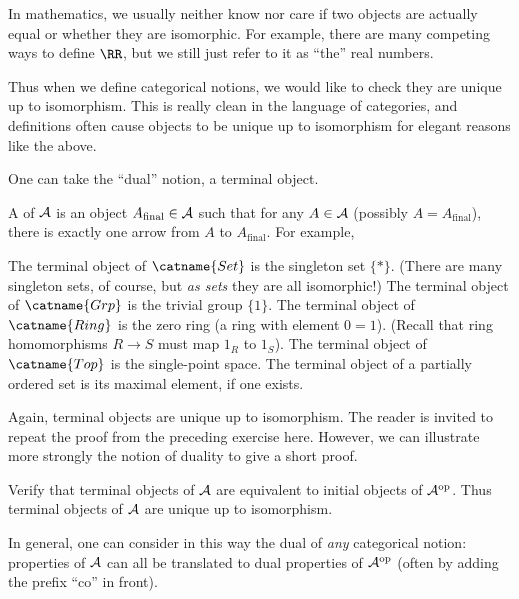 \begin{remark}
	In mathematics, we usually neither know nor care if two objects are actually equal
	or whether they are isomorphic.
	For example, there are many competing ways to define $\RR$,
	but we still just refer to it as ``the'' real numbers.

	Thus when we define categorical notions, we would like to check they are
	unique up to isomorphism.
	This is really clean in the language of categories, and definitions
	often cause objects to be unique up to isomorphism for elegant reasons like the above.
\end{remark}

One can take the ``dual'' notion, a terminal object.
\begin{example}
	A  of $\AA$ is an object
	$A_{\text{final}} \in \AA$ such that for any $A \in \AA$ (possibly $A = A_{\text{final}}$),
	there is exactly one arrow from $A$ to $A_{\text{final}}$.
	For example,
	\begin{enumerate}[(a)]
		\ii The terminal object of $\catname{Set}$ is the singleton set $\{\ast\}$.
		(There are many singleton sets, of course, but \emph{as sets} they are all isomorphic!)
		\ii The terminal object of $\catname{Grp}$ is the trivial group $\{1\}$.
		\ii The terminal object of $\catname{Ring}$ is the zero ring (a ring with element $0=1$).
		(Recall that ring homomorphisms $R \to S$ must map $1_R$ to $1_S$).
		\ii The terminal object of $\catname{Top}$ is the single-point space.
		\ii The terminal object of a partially ordered set is its maximal element, if one exists.
	\end{enumerate}
\end{example}

Again, terminal objects are unique up to isomorphism.
The reader is invited to repeat the proof from the preceding exercise here.
However, we can illustrate more strongly the notion of duality to give a short proof.
\begin{ques}
	Verify that terminal objects of $\AA$ are equivalent to initial objects of $\AA\op$.
	Thus terminal objects of $\AA$ are unique up to isomorphism.
\end{ques}
In general, one can consider in this way the dual of \emph{any} categorical notion:
properties of $\AA$ can all be translated to dual properties of $\AA\op$
(often by adding the prefix ``co'' in front).

